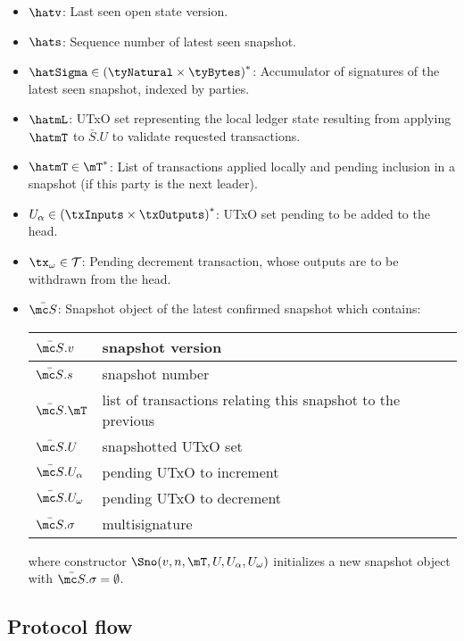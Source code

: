 \begin{itemize}
  \item $\hatv$: Last seen open state version.
  \item $\hats$: Sequence number of latest seen snapshot.
  \item $\hatSigma \in {(\tyNatural \times \tyBytes)}^{*}$: Accumulator of
        signatures of the latest seen snapshot, indexed by parties.
  \item $\hatmL$: UTxO set representing the local ledger state resulting from
        applying $\hatmT$ to $\bar{S}.U$ to validate requested transactions.
  \item $\hatmT \in \mT^{*}$: List of transactions applied locally and pending
        inclusion in a snapshot (if this party is the next leader).
  \item $U_\alpha \in {(\txInputs \times \txOutputs)}^{*}$: UTxO set pending to be added to the head.
  \item $\tx_\omega \in \mathcal{T}$: Pending decrement transaction, whose outputs are to be
        withdrawn from the head.
  \item $\bar{\mc S}$: Snapshot object of the latest confirmed snapshot which
        contains:
        \begin{center}
          \begin{tabular}{|l|l|}\hline
            $\bar{\mc S}.v$         & snapshot version \\ \hline
            $\bar{\mc S}.s$         & snapshot number \\ \hline
            $\bar{\mc S}.\mT$       & list of transactions relating this snapshot to the previous \\ \hline
            $\bar{\mc S}.U$         & snapshotted UTxO set \\ \hline
            $\bar{\mc S}.U_\alpha$ & pending UTxO to increment \\ \hline
            $\bar{\mc S}.U_\omega$       & pending UTxO to decrement \\ \hline
            $\bar{\mc S}.\sigma$         & multisignature \\ \hline
          \end{tabular}
        \end{center}
        where constructor $\Sno(v,n,\mT,U,U_\alpha, U_\omega)$ initializes a new snapshot object with $\bar{\mc S}.\sigma = \emptyset$.
\end{itemize}

\subsection{Protocol flow}

